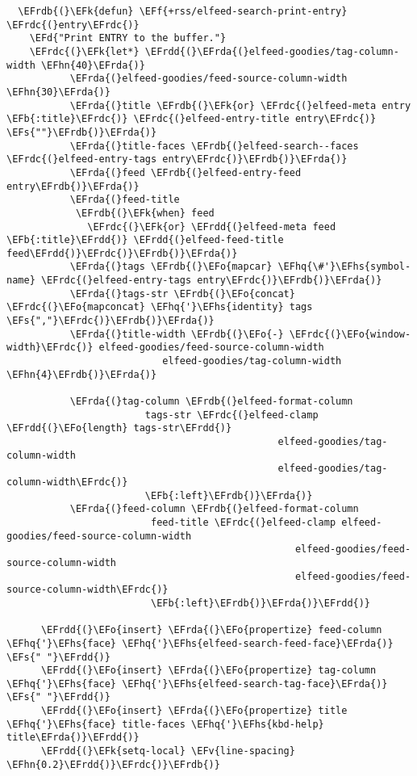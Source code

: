 \documentclass[c]{article}
\theoremstyle{plain}%
\theoremstyle{definition}
\theoremstyle{remark}
\newcommand{\EFs}[1]{\textcolor{EFs}{#1}} %
\newcommand{\EFd}[1]{\textcolor{EFd}{#1}} %
\newcommand{\EFk}[1]{\textcolor{EFk}{#1}} %
\newcommand{\EFb}[1]{\textcolor{EFb}{#1}} %
\newcommand{\EFf}[1]{\textcolor{EFf}{#1}} %
\newcommand{\EFv}[1]{\textcolor{EFv}{#1}} %
\newcommand{\EFo}[1]{\textcolor{EFo}{#1}} %
\newcommand{\EFhn}[1]{\textcolor{EFhn}{#1}} %
\newcommand{\EFhq}[1]{\textcolor{EFhq}{#1}} %
\newcommand{\EFhs}[1]{\textcolor{EFhs}{#1}} %
\newcommand{\EFrda}[1]{\textcolor{EFrda}{#1}} %
\newcommand{\EFrdb}[1]{\textcolor{EFrdb}{#1}} %
\newcommand{\EFrdc}[1]{\textcolor{EFrdc}{#1}} %
\newcommand{\EFrdd}[1]{\textcolor{EFrdd}{#1}} %
\begin{document}
\begin{Code}
\begin{Verbatim}
  \EFrdb{(}\EFk{defun} \EFf{+rss/elfeed-search-print-entry} \EFrdc{(}entry\EFrdc{)}
    \EFd{"Print ENTRY to the buffer."}
    \EFrdc{(}\EFk{let*} \EFrdd{(}\EFrda{(}elfeed-goodies/tag-column-width \EFhn{40}\EFrda{)}
           \EFrda{(}elfeed-goodies/feed-source-column-width \EFhn{30}\EFrda{)}
           \EFrda{(}title \EFrdb{(}\EFk{or} \EFrdc{(}elfeed-meta entry \EFb{:title}\EFrdc{)} \EFrdc{(}elfeed-entry-title entry\EFrdc{)} \EFs{""}\EFrdb{)}\EFrda{)}
           \EFrda{(}title-faces \EFrdb{(}elfeed-search--faces \EFrdc{(}elfeed-entry-tags entry\EFrdc{)}\EFrdb{)}\EFrda{)}
           \EFrda{(}feed \EFrdb{(}elfeed-entry-feed entry\EFrdb{)}\EFrda{)}
           \EFrda{(}feed-title
            \EFrdb{(}\EFk{when} feed
              \EFrdc{(}\EFk{or} \EFrdd{(}elfeed-meta feed \EFb{:title}\EFrdd{)} \EFrdd{(}elfeed-feed-title feed\EFrdd{)}\EFrdc{)}\EFrdb{)}\EFrda{)}
           \EFrda{(}tags \EFrdb{(}\EFo{mapcar} \EFhq{\#'}\EFhs{symbol-name} \EFrdc{(}elfeed-entry-tags entry\EFrdc{)}\EFrdb{)}\EFrda{)}
           \EFrda{(}tags-str \EFrdb{(}\EFo{concat} \EFrdc{(}\EFo{mapconcat} \EFhq{'}\EFhs{identity} tags \EFs{","}\EFrdc{)}\EFrdb{)}\EFrda{)}
           \EFrda{(}title-width \EFrdb{(}\EFo{-} \EFrdc{(}\EFo{window-width}\EFrdc{)} elfeed-goodies/feed-source-column-width
                           elfeed-goodies/tag-column-width \EFhn{4}\EFrdb{)}\EFrda{)}

           \EFrda{(}tag-column \EFrdb{(}elfeed-format-column
                        tags-str \EFrdc{(}elfeed-clamp \EFrdd{(}\EFo{length} tags-str\EFrdd{)}
                                               elfeed-goodies/tag-column-width
                                               elfeed-goodies/tag-column-width\EFrdc{)}
                        \EFb{:left}\EFrdb{)}\EFrda{)}
           \EFrda{(}feed-column \EFrdb{(}elfeed-format-column
                         feed-title \EFrdc{(}elfeed-clamp elfeed-goodies/feed-source-column-width
                                                  elfeed-goodies/feed-source-column-width
                                                  elfeed-goodies/feed-source-column-width\EFrdc{)}
                         \EFb{:left}\EFrdb{)}\EFrda{)}\EFrdd{)}

      \EFrdd{(}\EFo{insert} \EFrda{(}\EFo{propertize} feed-column \EFhq{'}\EFhs{face} \EFhq{'}\EFhs{elfeed-search-feed-face}\EFrda{)} \EFs{" "}\EFrdd{)}
      \EFrdd{(}\EFo{insert} \EFrda{(}\EFo{propertize} tag-column \EFhq{'}\EFhs{face} \EFhq{'}\EFhs{elfeed-search-tag-face}\EFrda{)} \EFs{" "}\EFrdd{)}
      \EFrdd{(}\EFo{insert} \EFrda{(}\EFo{propertize} title \EFhq{'}\EFhs{face} title-faces \EFhq{'}\EFhs{kbd-help} title\EFrda{)}\EFrdd{)}
      \EFrdd{(}\EFk{setq-local} \EFv{line-spacing} \EFhn{0.2}\EFrdd{)}\EFrdc{)}\EFrdb{)}


\end{Verbatim}
\end{Code}
\end{document}
